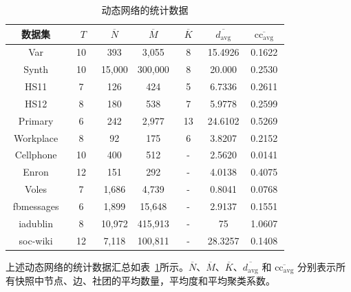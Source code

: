\begin{table}[htbp]
	\caption{动态网络的统计数据}\label{tab1}
	\vspace{0.5em}\centering\wuhao
	\centering%
	\renewcommand\arraystretch{1}{
		\begin{tabular}{ccccccc}
			\toprule[1.5pt]
			\centering
			~~数据集~~ & ~ $T$~ &~  $\overline{N}$ ~& ~$\overline{M}$~ & ~$\overline{K}$~ & ~$\overline{d_{\mathrm{avg}}}$~ & ~$\overline{\mathrm{cc}_{\mathrm{avg}}}$~\\
			\midrule[1.0pt]
			Var &  10 & 393 & 3,055 & 8 & 15.4926 & 0.1622\\ 
			
			Synth &  10 & 15,000 & 300,000 & 8 & 20.000 & 0.2530\\ 
			
			HS11 &  7 & 126 & 424 & 5 & 6.7336 & 0.2611\\
			
			HS12 &  8 & 180 & 538 & 7 & 5.9778 & 0.2599\\
			
			Primary &  6 & 242 & 2,977 & 13 & 24.6102 & 0.5269\\
			
			Workplace &  8 & 92 & 175 & 6 & 3.8207 & 0.2152\\
			
			Cellphone &  10 & 400 & 512 & - & 2.5620 & 0.0141\\
			
			Enron &  12 & 151 & 292 & - & 4.0138 & 0.4075\\
			
			Voles &  7 & 1,686 & 4,739 & - & 0.8041 & 0.0768\\
			
			fbmessages &  6 & 1,899 & 15,648 & - & 2.9137 & 0.1551\\
			
			iadublin & 8 & 10,972 & 415,913 & - & 75 & 1.0607\\
			
			soc-wiki & 12 & 7,118 & 100,811 & - & 28.3257 & 0.1408 \\
			\bottomrule[1.5pt]
	\end{tabular}} 
	\vspace{0cm}
\end{table}


上述动态网络的统计数据汇总如表~\ref{tab1}所示。$\overline{N}$、$\overline{M}$、$\overline{K}$、$\overline{d_{\mathrm{avg}}}$ 和 $\overline{\mathrm{cc}_{\mathrm{avg}}}$ 分别表示所有快照中节点、边、社团的平均数量，平均度和平均聚类系数。







